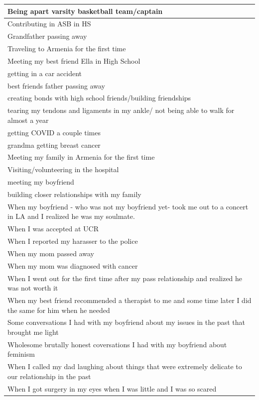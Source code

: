 \documentclass[
  .7em,
  letterpaper,
  DIV=11,
  numbers=noendperiod]{scrartcl}
\begin{document}
\begin{table}
\begin{tabular}{l}
\hline
Being apart varsity basketball team/captain\\
\hline
Contributing in ASB in HS\\
\hline
Grandfather passing away\\
\hline
Traveling to Armenia for the first time\\
\hline
Meeting my best friend Ella in High School\\
\hline
getting in a car accident\\
\hline
best friends father passing away\\
\hline
creating bonds with high school friends/building friendships\\
\hline
tearing my tendons and ligaments in my ankle/ not being able to walk for almost a year\\
\hline
getting COVID a couple times\\
\hline
grandma getting breast cancer\\
\hline
Meeting my family in Armenia for the first time\\
\hline
Visiting/volunteering in the hospital\\
\hline
meeting my boyfriend\\
\hline
building closer relationships with my family\\
\hline
When my boyfriend - who was not my boyfriend yet- took me out to a concert in LA and I realized he was my soulmate.\\
\hline
When I was accepted at UCR\\
\hline
When I reported my harasser to the police\\
\hline
When my mom passed away\\
\hline
When my mom was diagnosed with cancer\\
\hline
When I went out for the first time after my pass relationship and realized he was not worth it\\
\hline
When my best friend recommended a therapist to me and some time later I did the same for him when he needed\\
\hline
Some conversations I had with my boyfriend about my issues in the past that brought me light\\
\hline
Wholesome brutally honest coversations I had with my boyfriend about feminism\\
\hline
When I called my dad laughing about things that were extremely delicate to our relationship in the past\\
\hline
When I got surgery in my eyes when I was little and I was so scared\\

\end{tabular}
\end{table}
\end{document}
